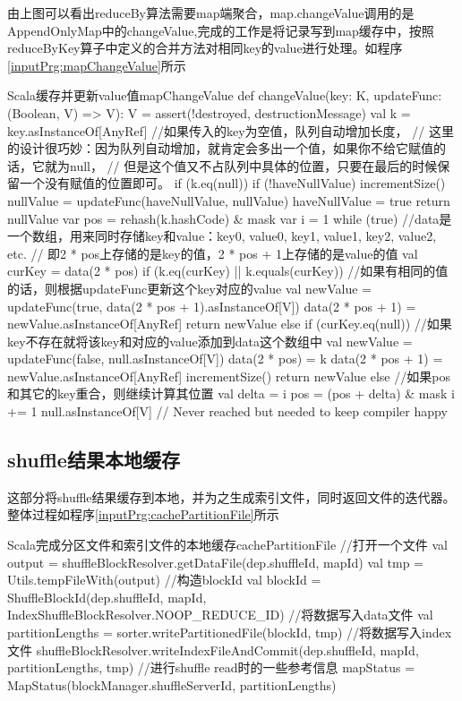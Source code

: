 由上图可以看出reduceBy算法需要map端聚合，map.changeValue调用的是AppendOnlyMap中的changeValue,完成的工作是将记录写到map缓存中，按照reduceByKey算子中定义的合并方法对相同key的value进行处理。如程序\ref{inputPrg:mapChangeValue}所示
\begin{codeInput}{Scala}{缓存并更新value值}{mapChangeValue}
def changeValue(key: K, updateFunc: (Boolean, V) => V): V = {
  assert(!destroyed, destructionMessage)
  val k = key.asInstanceOf[AnyRef]
  //如果传入的key为空值，队列自动增加长度，
  // 这里的设计很巧妙：因为队列自动增加，就肯定会多出一个值，如果你不给它赋值的话，它就为null，
  // 但是这个值又不占队列中具体的位置，只要在最后的时候保留一个没有赋值的位置即可。
  if (k.eq(null)) {
    if (!haveNullValue) {
      incrementSize()
    }
    nullValue = updateFunc(haveNullValue, nullValue)
    haveNullValue = true
    return nullValue
  }
  var pos = rehash(k.hashCode) & mask
  var i = 1
  while (true) {
    //data是一个数组，用来同时存储key和value：key0, value0, key1, value1, key2, value2, etc.
    // 即2 * pos上存储的是key的值，2 * pos + 1上存储的是value的值
    val curKey = data(2 * pos)
    if (k.eq(curKey) || k.equals(curKey)) {
      //如果有相同的值的话，则根据updateFunc更新这个key对应的value
      val newValue = updateFunc(true, data(2 * pos + 1).asInstanceOf[V])
      data(2 * pos + 1) = newValue.asInstanceOf[AnyRef]
      return newValue
    } else if (curKey.eq(null)) {
      //如果key不存在就将该key和对应的value添加到data这个数组中
      val newValue = updateFunc(false, null.asInstanceOf[V])
      data(2 * pos) = k
      data(2 * pos + 1) = newValue.asInstanceOf[AnyRef]
      incrementSize()
      return newValue
    } else {
      //如果pos和其它的key重合，则继续计算其位置
      val delta = i
      pos = (pos + delta) & mask
      i += 1
    }
  }
  null.asInstanceOf[V] // Never reached but needed to keep compiler happy
}
\end{codeInput}
\subsection{shuffle结果本地缓存}
这部分将shuffle结果缓存到本地，并为之生成索引文件，同时返回文件的迭代器。整体过程如程序\ref{inputPrg:cachePartitionFile}所示
\begin{codeInput}{Scala}{完成分区文件和索引文件的本地缓存}{cachePartitionFile}
//打开一个文件
val output = shuffleBlockResolver.getDataFile(dep.shuffleId, mapId)
val tmp = Utils.tempFileWith(output)
//构造blockId
val blockId = ShuffleBlockId(dep.shuffleId, mapId, IndexShuffleBlockResolver.NOOP_REDUCE_ID)
//将数据写入data文件
val partitionLengths = sorter.writePartitionedFile(blockId, tmp)
//将数据写入index文件
shuffleBlockResolver.writeIndexFileAndCommit(dep.shuffleId, mapId, partitionLengths, tmp)
//进行shuffle read时的一些参考信息
mapStatus = MapStatus(blockManager.shuffleServerId, partitionLengths)
\end{codeInput}
